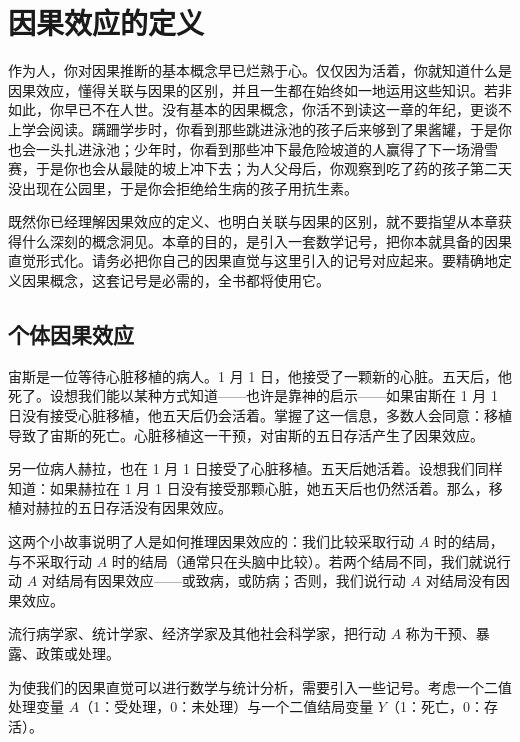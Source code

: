 \chapter{因果效应的定义}

作为人，你对因果推断的基本概念早已烂熟于心。仅仅因为活着，你就知道什么是因果效应，懂得关联与因果的区别，并且一生都在始终如一地运用这些知识。若非如此，你早已不在人世。没有基本的因果概念，你活不到读这一章的年纪，更谈不上学会阅读。蹒跚学步时，你看到那些跳进泳池的孩子后来够到了果酱罐，于是你也会一头扎进泳池；少年时，你看到那些冲下最危险坡道的人赢得了下一场滑雪赛，于是你也会从最陡的坡上冲下去；为人父母后，你观察到吃了药的孩子第二天没出现在公园里，于是你会拒绝给生病的孩子用抗生素。

既然你已经理解因果效应的定义、也明白关联与因果的区别，就不要指望从本章获得什么深刻的概念洞见。本章的目的，是引入一套数学记号，把你本就具备的因果直觉形式化。请务必把你自己的因果直觉与这里引入的记号对应起来。要精确地定义因果概念，这套记号是必需的，全书都将使用它。

\section{个体因果效应}

宙斯是一位等待心脏移植的病人。1 月 1 日，他接受了一颗新的心脏。五天后，他死了。设想我们能以某种方式知道——也许是靠神的启示——如果宙斯在 1 月 1 日没有接受心脏移植，他五天后仍会活着。掌握了这一信息，多数人会同意：移植导致了宙斯的死亡。心脏移植这一干预，对宙斯的五日存活产生了因果效应。

另一位病人赫拉，也在 1 月 1 日接受了心脏移植。五天后她活着。设想我们同样知道：如果赫拉在 1 月 1 日没有接受那颗心脏，她五天后也仍然活着。那么，移植对赫拉的五日存活没有因果效应。

这两个小故事说明了人是如何推理因果效应的：我们比较采取行动 $A$ 时的结局，与不采取行动 $A$ 时的结局（通常只在头脑中比较）。若两个结局不同，我们就说行动 $A$ 对结局有因果效应——或致病，或防病；否则，我们说行动 $A$ 对结局没有因果效应。


流行病学家、统计学家、经济学家及其他社会科学家，把行动 $A$ 称为干预、暴露、政策或处理。

为使我们的因果直觉可以进行数学与统计分析，需要引入一些记号。考虑一个二值处理变量 $A$（1：受处理，0：未处理）与一个二值结局变量 $Y$（1：死亡，0：存活）。


